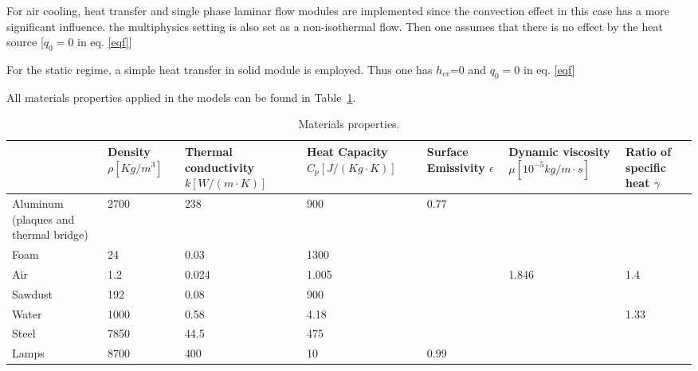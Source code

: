 \documentclass{tQRT2e}
\begin{document}
For air cooling, heat transfer and single phase laminar flow modules are implemented since the convection effect in this case has a more significant influence. the multiphysics setting is also set as a non-isothermal flow. Then one assumes that there is no effect by the heat source [$ q_0=0 $ in eq. \ref{eqf}]

For the static regime, a simple heat transfer in solid module is employed. Thus one has $ h_{cv} $=0 and $ q_0=0 $ in eq. \ref{eqf}

All materials properties applied in the models can be found in Table~\ref{mat_pro}. 
 \begin{table}[ht]
  	\centering
  	\scriptsize
 	\caption{Materials properties.}
 {\begin{tabular}{p{1.5cm}|p{1.5cm}p{1.5cm}p{1.5cm}p{1.5cm}p{1.5cm}p{1.5cm}}
 	\hline
	      & Density $\rho [Kg/m^3] $
	      & Thermal conductivity  $k [W/(m\cdot K)] $
          & Heat Capacity $C_p [J/(Kg\cdot K)]$
          & Surface Emissivity $\epsilon$
          & Dynamic viscosity $\mu [10^{-5}kg/m\cdot s]$ 
          & Ratio of specific heat $\gamma$   \\
	 \hline
   Aluminum (plaques and thermal bridge)	&2700	&238	&900 &0.77 & & \\
   Foam	&24	&0.03	&1300 & & & \\
   Air	&1.2 &0.024	&1.005 & &1.846 &1.4 \\
   Sawdust	&192	&0.08	&900 & & & \\
   Water &1000	&0.58	&4.18 & & &1.33 \\
   Steel &7850	&44.5	&475 & & & \\
   Lamps &8700	&400	&10 &0.99 & & \\
	 \hline
 \end{tabular}}
 \label{mat_pro}
 \end{table}
\end{document}
